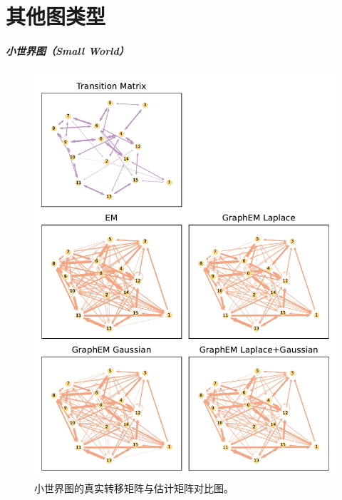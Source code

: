 



\chapter{其他图类型}

\paragraph*{小世界图（Small World）}
\begin{figure}[tb]
    \centering
    \includegraphics[width=0.75\linewidth]{fig/small world/graphs_for_true_and_EM.pdf}
    \caption{小世界图的真实转移矩阵与估计矩阵对比图。}
    \label{fig: small world graph comparison}
\end{figure}

